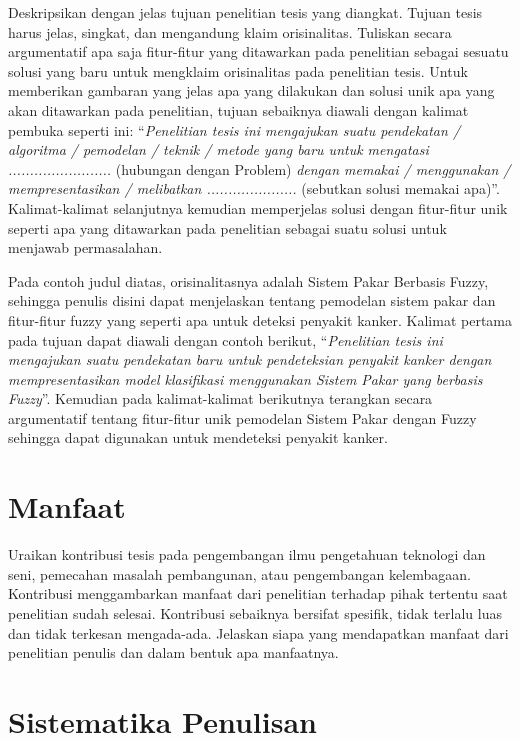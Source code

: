 Deskripsikan dengan jelas tujuan penelitian tesis yang diangkat. Tujuan tesis
harus jelas, singkat, dan mengandung klaim orisinalitas. Tuliskan secara
argumentatif apa saja fitur-fitur yang ditawarkan pada penelitian sebagai
sesuatu solusi yang baru untuk mengklaim orisinalitas pada penelitian tesis.
Untuk memberikan gambaran yang jelas apa yang dilakukan dan solusi unik apa
yang akan ditawarkan pada penelitian, tujuan sebaiknya diawali dengan kalimat
pembuka seperti ini: ``\textit{Penelitian tesis ini mengajukan suatu pendekatan
/ algoritma / pemodelan / teknik / metode yang baru untuk mengatasi
........................} (hubungan dengan Problem) \textit{dengan memakai /
menggunakan / mempresentasikan / melibatkan .....................} (sebutkan
solusi memakai apa)''. Kalimat-kalimat selanjutnya kemudian memperjelas solusi
dengan fitur-fitur unik seperti apa yang ditawarkan pada penelitian sebagai
suatu solusi untuk menjawab permasalahan.

Pada contoh judul diatas, orisinalitasnya adalah Sistem Pakar Berbasis Fuzzy,
sehingga penulis disini dapat menjelaskan tentang pemodelan sistem pakar dan
fitur-fitur fuzzy yang seperti apa untuk deteksi penyakit kanker. Kalimat
pertama pada tujuan dapat diawali dengan contoh berikut, ``\textit{Penelitian
tesis ini mengajukan suatu pendekatan baru untuk pendeteksian penyakit kanker
dengan mempresentasikan model klasifikasi menggunakan Sistem Pakar yang
berbasis Fuzzy}''. Kemudian pada kalimat-kalimat berikutnya terangkan secara
argumentatif tentang fitur-fitur unik pemodelan Sistem Pakar dengan Fuzzy
sehingga dapat digunakan untuk mendeteksi penyakit kanker.

\section{Manfaat}

Uraikan kontribusi tesis pada pengembangan ilmu pengetahuan teknologi dan seni,
pemecahan masalah pembangunan, atau pengembangan kelembagaan. Kontribusi
menggambarkan manfaat dari penelitian terhadap pihak tertentu saat penelitian
sudah selesai. Kontribusi sebaiknya bersifat spesifik, tidak terlalu luas dan
tidak terkesan mengada-ada. Jelaskan siapa yang mendapatkan manfaat dari
penelitian penulis dan dalam bentuk apa manfaatnya.

\section{Sistematika Penulisan}

